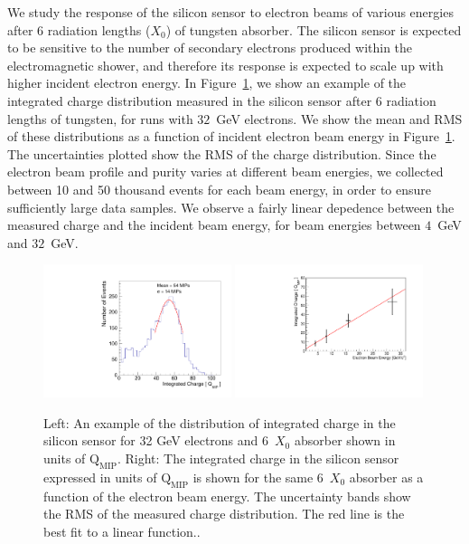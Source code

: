 We study the response of the silicon sensor to electron beams of various
energies after 6 radiation lengths ($X_0$) of tungsten absorber. The silicon
sensor is expected to be sensitive to the number of secondary electrons produced
within the electromagnetic shower, and therefore its response is expected to
scale up with higher incident electron energy. In
Figure~\ref{fig:ChargeDistributionExample}, we show an example of the integrated
charge distribution measured in the silicon sensor after 6 radiation lengths of
tungsten, for runs with $32$~GeV electrons. We show the mean and RMS of
these distributions as a function of incident electron beam energy in
Figure~\ref{fig:ChargeDistributionExample}. The uncertainties plotted show the RMS of the
charge distribution. Since the electron beam profile and purity varies at different beam energies, we collected between 10 and 50 thousand events for each beam energy, in order to ensure sufficiently large data samples. We observe a fairly linear depedence between the measured
charge and the incident beam energy, for beam energies between $4$~GeV and
$32$~GeV. 

\begin{figure}[htbp] 
\centering
\includegraphics[width=0.49\textwidth]{plots/Electron_6X0_32GeV_chargeMIP.pdf} 
\includegraphics[width=0.49\textwidth]{plots/MIPVsEnergyAt6X0.pdf} 
\caption{ Left: An example of the distribution of integrated charge in the
silicon sensor for 32 GeV electrons and $6$~$X_0$ absorber shown in units of 
$\mathrm{Q}_{\mathrm{MIP}}$. Right: The integrated charge in the silicon sensor 
expressed in units of $\mathrm{Q}_{\mathrm{MIP}}$
is shown for the same $6$~$X_0$ absorber as a function of the electron beam energy. 
The uncertainty bands show the RMS of the measured charge distribution. The red line
is the best fit to a linear function..} 
\label{fig:ChargeDistributionExample}
\end{figure}

